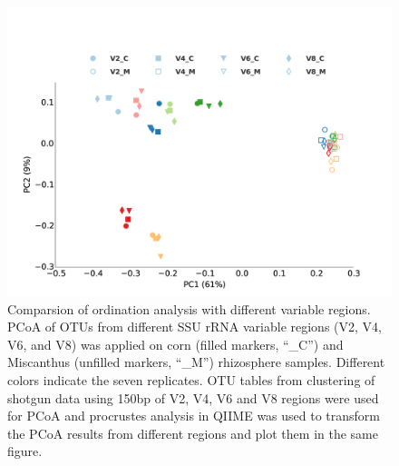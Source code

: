 \documentclass[]{msu-thesis}
\begin{document}
\begin{figure}[tbph!]
  \centering
  \includegraphics[width=1\textwidth]{figs/chap2_fig2}
  \caption[Comparsion of ordination analysis with different variable regions]{Comparsion of ordination analysis with different variable regions. PCoA of OTUs from different SSU rRNA variable regions (V2, V4, V6, and V8) was applied on corn (filled markers, ``\_C'') and Miscanthus (unfilled markers, ``\_M'') rhizosphere samples. Different colors indicate the seven replicates. OTU tables from clustering of shotgun data using 150bp of V2, V4, V6 and V8 regions were used for PCoA and procrustes analysis in QIIME was used to transform the PCoA results from different regions and plot them in the same figure.}
  \label{fig:chap2Fig2}
\end{figure}
\end{document}
